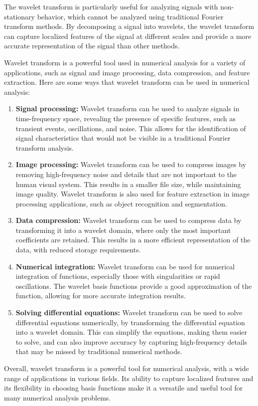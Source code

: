 \documentclass{article}
\begin{document}
The wavelet transform is particularly useful for analyzing signals with non-stationary behavior, which cannot be analyzed using traditional Fourier transform methods. By decomposing a signal into wavelets, the wavelet transform can capture localized features of the signal at different scales and provide a more accurate representation of the signal than other methods.

Wavelet transform is a powerful tool used in numerical analysis for a variety of applications, such as signal and image processing, data compression, and feature extraction. Here are some ways that wavelet transform can be used in numerical analysis:
\begin{enumerate}

\item \textbf{Signal processing:}  Wavelet transform can be used to analyze signals in time-frequency space, revealing the presence of specific features, such as transient events, oscillations, and noise. This allows for the identification of signal characteristics that would not be visible in a traditional Fourier transform analysis.

\item \textbf{Image processing: } Wavelet transform can be used to compress images by removing high-frequency noise and details that are not important to the human visual system. This results in a smaller file size, while maintaining image quality. Wavelet transform is also used for feature extraction in image processing applications, such as object recognition and segmentation.

\item \textbf{Data compression:}  Wavelet transform can be used to compress data by transforming it into a wavelet domain, where only the most important coefficients are retained. This results in a more efficient representation of the data, with reduced storage requirements.

\item \textbf{Numerical integration:}  Wavelet transform can be used for numerical integration of functions, especially those with singularities or rapid oscillations. The wavelet basis functions provide a good approximation of the function, allowing for more accurate integration results.

\item \textbf{Solving differential equations:}  Wavelet transform can be used to solve differential equations numerically, by transforming the differential equation into a wavelet domain. This can simplify the equations, making them easier to solve, and can also improve accuracy by capturing high-frequency details that may be missed by traditional numerical methods.
\end{enumerate}
Overall, wavelet transform is a powerful tool for numerical analysis, with a wide range of applications in various fields. Its ability to capture localized features and its flexibility in choosing basis functions make it a versatile and useful tool for many numerical analysis problems.
\end{document}
